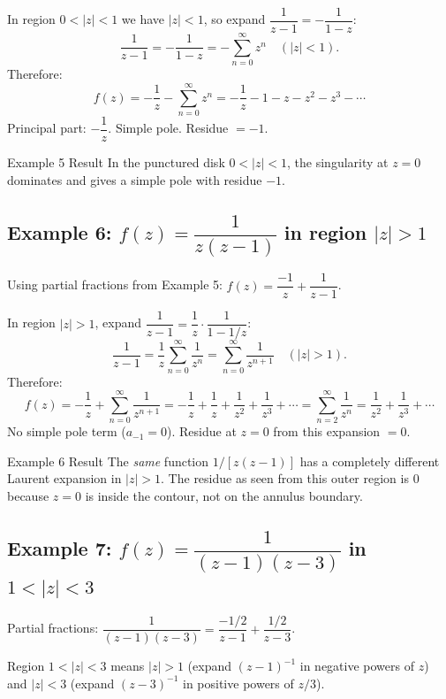 \documentclass[12pt,a4paper]{article}
\begin{document}
In region $0 < |z| < 1$ we have $|z|<1$, so expand $\dfrac{1}{z-1} = -\dfrac{1}{1-z}$:
\[
  \frac{1}{z-1} = -\frac{1}{1-z} = -\sum_{n=0}^{\infty} z^n \quad (|z|<1).
\]
Therefore:
\[
  f(z) = -\frac{1}{z} - \sum_{n=0}^{\infty} z^n
       = -\frac{1}{z} - 1 - z - z^2 - z^3 - \cdots
\]
Principal part: $-\dfrac{1}{z}$. Simple pole. Residue $= -1$.

\begin{learnbox}{Example 5 Result}
In the punctured disk $0<|z|<1$, the singularity at $z=0$ dominates and gives a simple pole with residue $-1$.
\end{learnbox}

\subsection*{Example 6: $f(z)=\dfrac{1}{z(z-1)}$ in region $|z|>1$}

Using partial fractions from Example 5: $f(z) = \dfrac{-1}{z}+\dfrac{1}{z-1}$.

In region $|z|>1$, expand $\dfrac{1}{z-1} = \dfrac{1}{z}\cdot\dfrac{1}{1-1/z}$:
\[
  \frac{1}{z-1} = \frac{1}{z}\sum_{n=0}^{\infty}\frac{1}{z^n} = \sum_{n=0}^{\infty}\frac{1}{z^{n+1}} \quad (|z|>1).
\]
Therefore:
\[
  f(z) = -\frac{1}{z} + \sum_{n=0}^{\infty}\frac{1}{z^{n+1}}
       = -\frac{1}{z} + \frac{1}{z} + \frac{1}{z^2} + \frac{1}{z^3} + \cdots
       = \sum_{n=2}^{\infty}\frac{1}{z^n}
       = \frac{1}{z^2} + \frac{1}{z^3} + \cdots
\]
No simple pole term ($a_{-1}=0$). Residue at $z=0$ from this expansion $= 0$.

\begin{learnbox}{Example 6 Result}
The \emph{same} function $1/[z(z-1)]$ has a completely different Laurent expansion in $|z|>1$. The residue as seen from this outer region is $0$ because $z=0$ is inside the contour, not on the annulus boundary.
\end{learnbox}

\subsection*{Example 7: $f(z)=\dfrac{1}{(z-1)(z-3)}$ in $1<|z|<3$}

Partial fractions: $\dfrac{1}{(z-1)(z-3)} = \dfrac{-1/2}{z-1} + \dfrac{1/2}{z-3}$.

Region $1 < |z| < 3$ means $|z|>1$ (expand $(z-1)^{-1}$ in negative powers of $z$)
and $|z|<3$ (expand $(z-3)^{-1}$ in positive powers of $z/3$).
\end{document}
